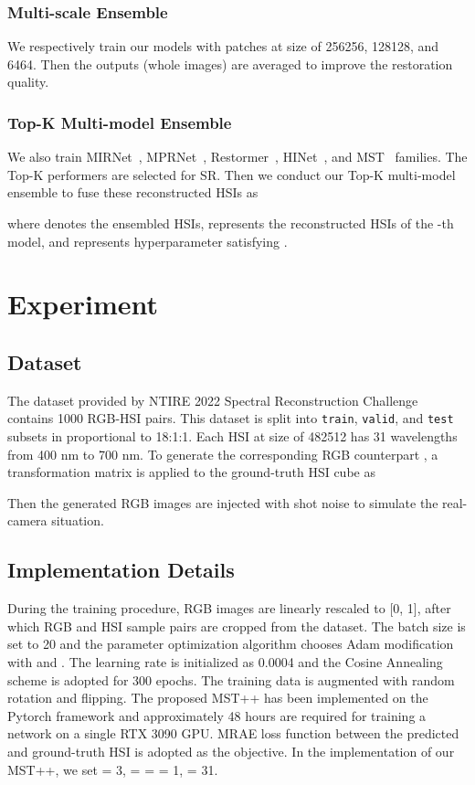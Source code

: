 \documentclass[10pt,twocolumn,letterpaper]{article}
\begin{document}
\subsubsection{Multi-scale Ensemble}
We respectively train our models with patches at size of 256256, 128128, and 6464. Then the outputs (whole images) are averaged to improve the restoration quality.

\subsubsection{Top-K Multi-model Ensemble}
We also train MIRNet~\cite{mirnet}, MPRNet~\cite{mprnet}, Restormer~\cite{restormer}, HINet~\cite{hinet}, and MST~\cite{mst} families. The Top-K performers are selected for SR. Then we conduct our Top-K multi-model ensemble to fuse these reconstructed HSIs as

where  denotes the ensembled HSIs,  represents the reconstructed HSIs of the -th model, and  represents hyperparameter satisfying . 


\section{Experiment}
\subsection{Dataset}
The dataset provided by NTIRE 2022 Spectral Reconstruction Challenge contains 1000 RGB-HSI pairs. This dataset is split into \texttt{train},  \texttt{valid}, and \texttt{test} subsets  in proportional to 18:1:1. Each HSI at size of 482512 has 31 wavelengths from 400 nm to 700 nm. To generate the corresponding RGB counterpart , a transformation matrix  is applied to the ground-truth HSI cube  as 

Then the generated RGB images are injected with shot noise to simulate the real-camera situation. 

\subsection{Implementation Details}
During the training procedure, RGB images are linearly rescaled to [0, 1], after which  RGB and HSI sample pairs are cropped from the dataset. The batch size is set to 20 and the parameter optimization algorithm chooses Adam modification with  and . The learning rate is initialized as 0.0004 and the Cosine Annealing scheme is adopted for 300 epochs. The training data is augmented with random rotation and flipping. The proposed MST++ has been implemented on the Pytorch framework and approximately 48 hours are required for training a network on a single RTX 3090 GPU. MRAE loss function between the predicted and ground-truth HSI is adopted as the objective. In the implementation of our MST++, we set  = 3,  =  =  = 1,  = 31. 
\end{document}

